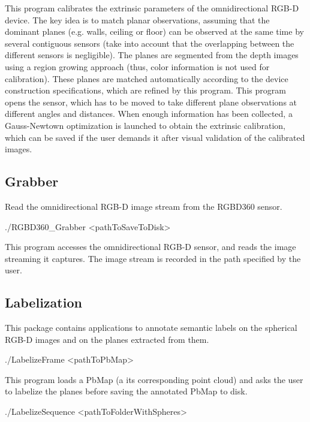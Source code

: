 This program calibrates the extrinsic parameters of the omnidirectional R\-G\-B-\/\-D device. The key idea is to match planar observations, assuming that the dominant planes (e.\-g. walls, ceiling or floor) can be observed at the same time by several contiguous sensors (take into account that the overlapping between the different sensors is negligible). The planes are segmented from the depth images using a region growing approach (thus, color information is not used for calibration). These planes are matched automatically according to the device construction specifications, which are refined by this program. This program opens the sensor, which has to be moved to take different plane observations at different angles and distances. When enough information has been collected, a Gauss-\/\-Newtown optimization is launched to obtain the extrinsic calibration, which can be saved if the user demands it after visual validation of the calibrated images.\hypertarget{index_Grabber}{}\subsection{Grabber}\label{index_Grabber}
Read the omnidirectional R\-G\-B-\/\-D image stream from the R\-G\-B\-D360 sensor.

\begin{DoxyVerb}./RGBD360_Grabber <pathToSaveToDisk>
\end{DoxyVerb}


This program accesses the omnidirectional R\-G\-B-\/\-D sensor, and reads the image streaming it captures. The image stream is recorded in the path specified by the user. \hypertarget{index_Labelization}{}\subsection{Labelization}\label{index_Labelization}
This package contains applications to annotate semantic labels on the spherical R\-G\-B-\/\-D images and on the planes extracted from them.

\begin{DoxyVerb}./LabelizeFrame <pathToPbMap>
\end{DoxyVerb}


This program loads a Pb\-Map (a its corresponding point cloud) and asks the user to labelize the planes before saving the annotated Pb\-Map to disk.

\begin{DoxyVerb}./LabelizeSequence <pathToFolderWithSpheres>
\end{DoxyVerb}


